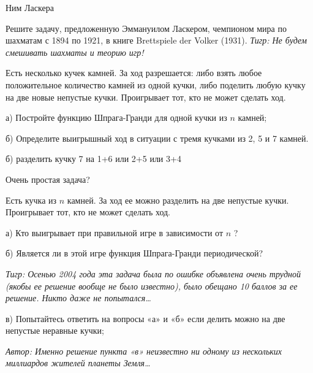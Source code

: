 \begin{problem}
 Ним Ласкера\par
Решите задачу, предложенную Эммануилом Ласкером, чемпионом мира по шахматам с 1894 по 1921, в книге Brettspiele der Volker (1931). {\it Тигр: Не будем смешивать шахматы и теорию игр!}\par
Есть несколько кучек камней. За ход разрешается: либо взять любое положительное количество камней из одной кучки, либо поделить любую кучку на две новые непустые кучки. Проигрывает тот, кто не может сделать ход.\par
а)	Постройте функцию Шпрага-Гранди для одной кучки из  $n$  камней;\par
б)	Определите выигрышный ход в ситуации с тремя кучками из 2, 5 и 7 камней.\par



\begin{sol}
б) разделить кучку 7 на 1+6 или 2+5 или 3+4
\end{sol}
\end{problem}



\begin{problem}
 Очень простая задача?\par
Есть кучка из  $n$  камней. За ход ее можно разделить на две непустые кучки. Проигрывает тот, кто не может сделать ход. \par
а)	Кто выигрывает при правильной игре в зависимости от  $n$ ?\par
б)	Является ли в этой игре функция Шпрага-Гранди периодической?\par
{\it Тигр: Осенью 2004 года эта задача была по ошибке объявлена очень трудной (якобы ее решение вообще не было известно), было обещано 10 баллов за ее решение. Никто даже не попытался\ldots }\par
в)	Попытайтесь ответить на вопросы «а» и «б» если делить можно на две непустые неравные кучки;\par
{\it Автор: Именно решение пункта «в» неизвестно ни одному из нескольких миллиардов жителей планеты Земля\ldots }\par



\begin{sol}

\end{sol}
\end{problem}





